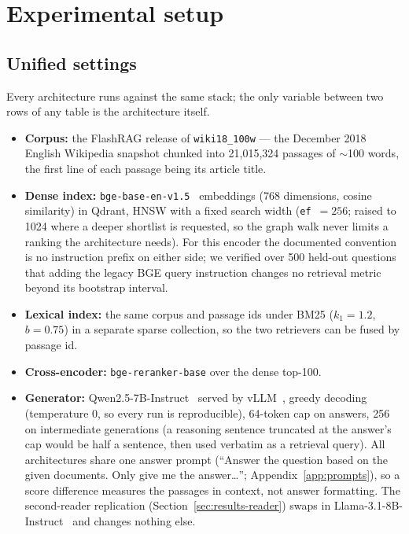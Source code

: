 \section{Experimental setup}
\label{sec:setup}

\subsection{Unified settings}
\label{sec:setup-unified}

Every architecture runs against the same stack; the only variable between
two rows of any table is the architecture itself.

\begin{itemize}
\item \textbf{Corpus:} the FlashRAG release of \texttt{wiki18\_100w}
  \citep{jin2024flashrag} --- the December 2018 English Wikipedia snapshot
  chunked into 21{,}015{,}324 passages of $\sim$100 words, the first line
  of each passage being its article title.
\item \textbf{Dense index:} \texttt{bge-base-en-v1.5}~\citep{xiao2023bge}
  embeddings (768 dimensions, cosine similarity) in Qdrant, HNSW with a
  fixed search width (\texttt{ef}~$=256$; raised to 1024 where a deeper
  shortlist is requested, so the graph walk never limits a ranking the
  architecture needs). For this encoder the documented convention is no
  instruction prefix on either side; we verified over 500 held-out
  questions that adding the legacy BGE query instruction changes no
  retrieval metric beyond its bootstrap interval.
\item \textbf{Lexical index:} the same corpus and passage ids under BM25
  ($k_1{=}1.2$, $b{=}0.75$) in a separate sparse collection, so the two
  retrievers can be fused by passage id.
\item \textbf{Cross-encoder:} \texttt{bge-reranker-base} over the dense
  top-100.
\item \textbf{Generator:} Qwen2.5-7B-Instruct~\citep{qwen2025qwen25} served
  by vLLM~\citep{kwon2023vllm}, greedy decoding (temperature 0, so every
  run is reproducible), 64-token cap on answers, 256 on intermediate
  generations (a reasoning sentence truncated at the answer's cap would be
  half a sentence, then used verbatim as a retrieval query). All
  architectures share one answer prompt (``Answer the question based on
  the given documents. Only give me the answer\ldots'';
  Appendix~\ref{app:prompts}), so a score difference measures the passages
  in context, not answer formatting. The second-reader replication
  (Section~\ref{sec:results-reader}) swaps in
  Llama-3.1-8B-Instruct~\citep{grattafiori2024llama3} and changes nothing
  else.
\end{itemize}


